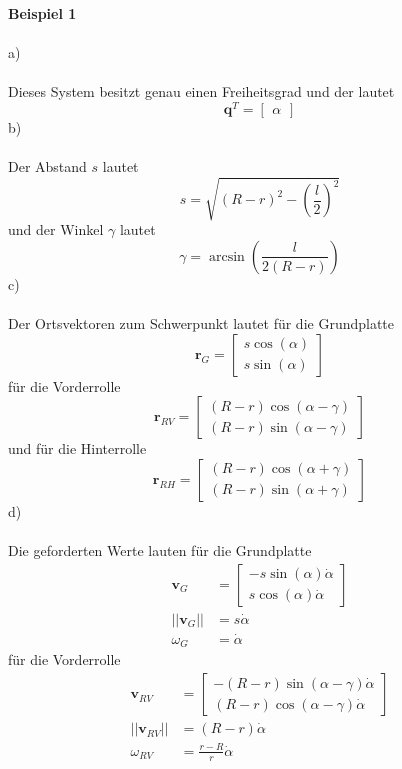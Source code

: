 \newpage
\noindent
\textbf{Beispiel 1}\\ \\
a)\\ \\
Dieses System besitzt genau einen Freiheitsgrad und der lautet
\[
	\textbf{q}^T = \begin{bmatrix}
		\alpha
	\end{bmatrix}
\]
b)\\ \\
Der Abstand $s$ lautet
\[
	s = \sqrt{(R - r)^2 - \left(\frac{l}{2}\right)^2}
\]
und der Winkel $\gamma$ lautet
\[
	\gamma = \arcsin\left(\frac{l}{2(R - r)}\right)
\]
c)\\ \\
Der Ortsvektoren zum Schwerpunkt lautet für die Grundplatte
\[
	\textbf{r}_G = \begin{bmatrix}
		s\cos(\alpha) \\
		s\sin(\alpha)
	\end{bmatrix}
\]
für die Vorderrolle
\[
	\textbf{r}_{RV} = \begin{bmatrix}
		(R - r)\cos(\alpha - \gamma) \\
		(R - r)\sin(\alpha -  \gamma)
	\end{bmatrix}
\]
und für die Hinterrolle
\[
	\textbf{r}_{RH} = \begin{bmatrix}
		(R - r)\cos(\alpha + \gamma) \\
		(R - r)\sin(\alpha + \gamma)
	\end{bmatrix}
\]
d) \\ \\
Die geforderten Werte lauten für die Grundplatte
\begin{align*}
	\textbf{v}_G &= \begin{bmatrix}
		-s\sin(\alpha)\dot{\alpha} \\
		s\cos(\alpha)\dot{\alpha}
	\end{bmatrix}
	\\
	||\textbf{v}_G|| &= s\dot{\alpha} \\
	\omega_G &= \dot{\alpha}
\end{align*}
für die Vorderrolle
\begin{align*}
	\textbf{v}_{RV} &= \begin{bmatrix}
		-(R - r)\sin(\alpha - \gamma)\dot{\alpha} \\
		(R - r)\cos(\alpha - \gamma)\dot{\alpha}	
	\end{bmatrix}
	\\
	||\textbf{v}_{RV}|| &= (R - r)\dot{\alpha} \\
	\omega_{RV} &= \frac{r - R}{r}\dot{\alpha}
\end{align*}
